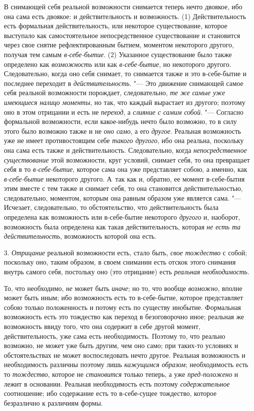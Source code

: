В снимающей себя реальной возможности снимается теперь нечто двоякое, ибо
она сама есть двоякое: и действительность и возможность. (1)
Действительность есть формальная действительность, или некоторое
существование, которое выступало как самостоятельное непосредственное
существование и становится через свое снятие рефлектированным бытием,
моментом некоторого другого, получая тем самым
{\em в-себе-бытие}. (2) Указанное существование было
также определено как {\em возможность} или как
{\em в-себе-бытие}, но некоторого другого.
Следовательно, когда оно себя снимает, то снимается также и это
в-себе-бытие и последнее переходит в
{\em действительность}. "--- Это движение снимающей самое
себя реальной возможности порождает, следовательно,
{\em те же самые уже имеющиеся налицо моменты}, но так,
что каждый вырастает из другого; поэтому оно в этом отрицании и есть не
{\em переход}, а {\em слияние с
самим собой}. "--- Согласно формальной возможности, если какое-нибудь нечто
было возможно, то в силу этого было возможно также и не
{\em оно само}, а его {\em другое}.
Реальная возможность уже не имеет противостоящим себе
{\em такого другого}, ибо она реальна, поскольку она
сама есть также и действительность. Следовательно, когда
{\em непосредственное существование} этой возможности,
круг условий, снимает себя, то она превращает себя в то
{\em в-себе-бытие}, которое сама она уже представляет
собою, а именно, как {\em в-себе-бытие} некоторого
другого. А~так как и, обратно, ее момент в-себе-бытия этим вместе с тем
также и снимает себя, то она становится действительностью, следовательно,
моментом, которым она равным образом уже является сама. "--- Исчезает,
следовательно, то обстоятельство, что действительность была определена как
возможность или в-себе-бытие некоторого {\em другого}
и, наоборот, возможность была определена как такая действительность,
которая {\em не есть та действительность}, возможность
которой она есть.

3. {\em Отрицание} реальной возможности есть, стало
быть, {\em свое тождество} с собой; поскольку оно,
таким образом, в своем снимании есть отскок этого снимания внутрь самого
себя, постольку оно (это отрицание) есть {\em реальная
необходимость}.

То, что необходимо, {\em не} может быть
{\em иначе}; но то, что вообще
{\em возможно}, вполне может быть иным; ибо возможность
есть то в-себе-бытие, которое представляет собою только положенность и
потому есть по существу инобытие. Формальная возможность есть это тождество
как переход в безоговорочно иное; реальная же возможность ввиду того, что
она содержит в себе другой момент, действительность, уже сама есть
необходимость. Поэтому то, что реально возможно, не может уже быть другим,
чем оно само; при таких-то условиях и обстоятельствах не может
воспоследовать нечто другое. Реальная возможность и необходимость различны
поэтому лишь {\em кажущимся образом}; необходимость
есть то {\em тождество}, которое не
{\em становится} только теперь, а уже
{\em пред-положено} и лежит в основании. Реальная
необходимость есть поэтому {\em содержательное}
соотношение; ибо содержание есть то в-себе-сущее тождество, которое
безразлично к различиям формы.

